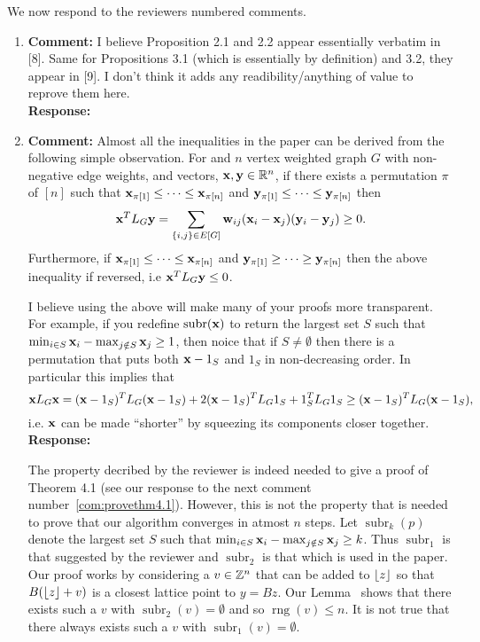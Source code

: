 \documentclass[a4paper,10pt]{article}
\begin{document}
We now respond to the reviewers numbered comments.

\begin{enumerate}

\item\textbf{Comment:} 
I believe Proposition 2.1 and 2.2 appear essentially verbatim in [8]. Same for Propositions
3.1 (which is essentially by definition) and 3.2, they appear in [9]. I don’t think it adds any
readibility/anything of value to reprove them here.
\\\textbf{Response:}

\newcommand{\rng}{\operatorname{rng}}
\newcommand{\subrng}{\operatorname{subr}}
\newcommand{\decrng}{\operatorname{decrng}}

\item\textbf{Comment:} 
Almost all the inequalities in the paper can be derived from the following simple observation.  For and $n$ vertex weighted graph $G$ with non-negative edge weights, and vectors, $\mathbf{x},\mathbf{y} \in {\mathbb R}^n$, if there exists a permutation $\pi$ of $[n]$ such that $\mathbf{x}_{\pi[1]} \leq \dots \leq \mathbf{x}_{\pi[n]}$ and $\mathbf{y}_{\pi[1]} \leq \dots \leq \mathbf{y}_{\pi[n]}$ then
\[
\mathbf{x}^T L_G \mathbf{y} = \sum_{ \{i,j\} \in E[G] } \mathbf{w}_{ij} (\mathbf{x}_{i} - \mathbf{x}_{j}) (\mathbf{y}_{i} - \mathbf{y}_{j}) \geq 0.
\]
Furthermore, if $\mathbf{x}_{\pi[1]} \leq \dots \leq \mathbf{x}_{\pi[n]}$ and $\mathbf{y}_{\pi[1]} \geq \dots \geq \mathbf{y}_{\pi[n]}$ then the above inequality if reversed, i.e $\mathbf{x}^T L_G \mathbf{y} \leq 0$. 

I believe using the above will make many of your proofs more transparent.  For example, if you redefine $\subrng(\xbf)$ to return the largest set $S$ such that $\min_{i\in S} \mathbf{x}_i - \max_{j \notin S} \mathbf{x}_j \geq 1$, then noice that if $S \neq \emptyset$ then there is a permutation that puts both $\mathbf{x} - 1_S$ and $1_S$ in non-decreasing order. In particular this implies that
\[
\mathbf{x} L_G \mathbf{x} = (\mathbf{x} - 1_S)^T L_G (\mathbf{x} - 1_S) + 2(\mathbf{x} - 1_S)^T L_G 1_S + 1_S^T L_G 1_S \geq (\mathbf{x} - 1_S)^T L_G (\mathbf{x} - 1_S),
\]
i.e. $\mathbf{x}$ can be made ``shorter'' by squeezing its components closer together.
\\\textbf{Response:}

The property decribed by the reviewer is indeed needed to give a proof of Theorem 4.1 (see our response to the next comment number~\ref{com:provethm4.1}).  However, this is not the property that is needed to prove that our algorithm converges in atmost $n$ steps.  Let $\subrng_k(p)$ denote the largest set $S$ such that $\min_{i\in S} \mathbf{x}_i - \max_{j \notin S} \mathbf{x}_j \geq k$. Thus $\subrng_1$ is that suggested by the reviewer and $\subrng_2$ is that which is used in the paper.  Our proof works by considering a $v \in {\mathbb Z}^n$ that can be added to ${\left\lfloor z \right\rfloor}$ so that $B({\left\lfloor z \right\rfloor} + v)$ is a closest lattice point to $y = Bz$.  Our Lemma~ shows that there exists such a $v$ with $\subrng_2(v) = \emptyset$ and so $\rng(v) \leq n$.  It is not true that there always exists such a $v$ with  $\subrng_1(v) = \emptyset$.


\end{enumerate}
\end{document}

